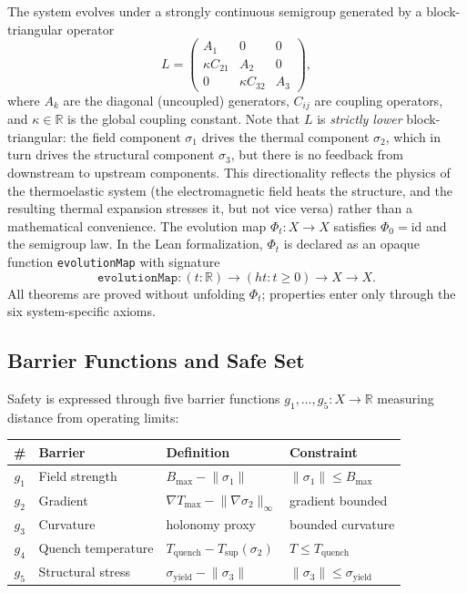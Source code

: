 \documentclass[11pt,a4paper]{article}
\theoremstyle{plain}
\theoremstyle{definition}
\theoremstyle{remark}
\newcommand{\R}{\mathbb{R}}
\newcommand{\norm}[1]{\lVert #1 \rVert}
\newcommand{\kk}{\kappa}
\newcommand{\leaninline}[1]{\texttt{#1}}
\begin{document}
The system evolves under a strongly continuous semigroup generated by a
block-triangular operator
\begin{equation}\label{eq:generator}
  L =
  \begin{pmatrix}
    A_1 & 0 & 0 \\
    \kk C_{21} & A_2 & 0 \\
    0 & \kk C_{32} & A_3
  \end{pmatrix},
\end{equation}
where $A_k$ are the diagonal (uncoupled) generators, $C_{ij}$ are
coupling operators, and $\kk \in \R$ is the global coupling constant.
Note that $L$ is \emph{strictly lower} block-triangular: the field
component $\sigma_1$ drives the thermal component $\sigma_2$, which in
turn drives the structural component $\sigma_3$, but there is no
feedback from downstream to upstream components.  This directionality
reflects the physics of the thermoelastic system (the electromagnetic
field heats the structure, and the resulting thermal expansion stresses
it, but not vice versa) rather than a mathematical convenience.
The evolution map $\Phi_t : X \to X$ satisfies $\Phi_0 = \mathrm{id}$
and the semigroup law.  In the Lean formalization, $\Phi_t$ is declared
as an opaque function \leaninline{evolutionMap} with signature
\[
  \leaninline{evolutionMap} : (t : \R) \to (ht : t \ge 0) \to X \to X.
\]
All theorems are proved without unfolding $\Phi_t$; properties enter
only through the six system-specific axioms.

\subsection{Barrier Functions and Safe Set}

Safety is expressed through five barrier functions
$g_1, \ldots, g_5 : X \to \R$ measuring distance from operating limits:

\begin{center}
\begin{tabular}{clll}
  \toprule
  \# & Barrier & Definition & Constraint \\
  \midrule
  $g_1$ & Field strength & $B_{\max} - \norm{\sigma_1}$ & $\norm{\sigma_1} \le B_{\max}$ \\
  $g_2$ & Gradient & $\nabla T_{\max} - \norm{\nabla \sigma_2}_\infty$ & gradient bounded \\
  $g_3$ & Curvature & holonomy proxy & bounded curvature \\
  $g_4$ & Quench temperature & $T_{\mathrm{quench}} - T_{\sup}(\sigma_2)$ & $T \le T_{\mathrm{quench}}$ \\
  $g_5$ & Structural stress & $\sigma_{\mathrm{yield}} - \norm{\sigma_3}$ & $\norm{\sigma_3} \le \sigma_{\mathrm{yield}}$ \\
  \bottomrule
\end{tabular}
\end{center}
\end{document}
